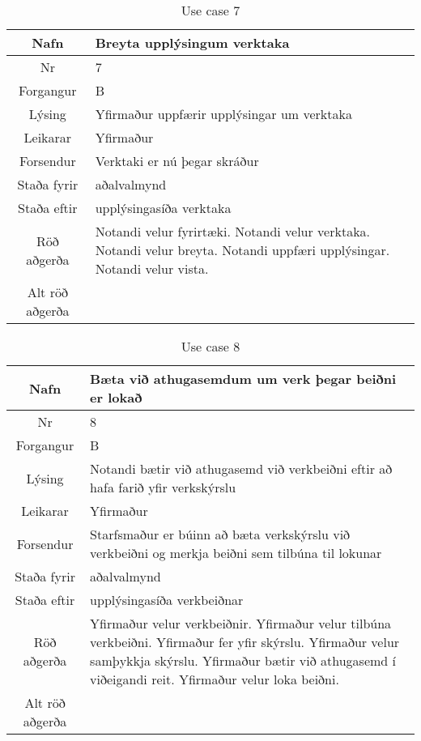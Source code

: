 \begin{table}[h!]\centering
\begin{tabular}{|c|p{10cm}|}
\hline
Nafn&Breyta upplýsingum verktaka \\
\hline
Nr&7\\
\hline
Forgangur&B\\
\hline
Lýsing&Yfirmaður uppfærir upplýsingar um verktaka\\
\hline
Leikarar&Yfirmaður\\
\hline
Forsendur&Verktaki er nú þegar skráður\\
\hline
Staða fyrir&aðalvalmynd\\
\hline
Staða eftir&upplýsingasíða verktaka\\
\hline
Röð aðgerða&Notandi velur fyrirtæki. Notandi velur verktaka. Notandi velur breyta. Notandi uppfæri upplýsingar. Notandi velur vista.\\
\hline
Alt röð aðgerða&\\
\hline
\end{tabular}
\caption{Use case 7}\label{tab:use_case_7}
\end{table}
\begin{table}[h!]\centering
\begin{tabular}{|c|p{10cm}|}
\hline
Nafn&Bæta við athugasemdum um verk þegar beiðni er lokað\\
\hline
Nr&8\\
\hline
Forgangur&B\\
\hline
Lýsing&Notandi bætir við athugasemd við verkbeiðni eftir að hafa farið yfir verkskýrslu\\
\hline
Leikarar&Yfirmaður\\
\hline
Forsendur&Starfsmaður er búinn að bæta verkskýrslu við verkbeiðni og merkja beiðni sem tilbúna til lokunar\\
\hline
Staða fyrir&aðalvalmynd\\
\hline
Staða eftir&upplýsingasíða verkbeiðnar\\
\hline
Röð aðgerða&Yfirmaður velur verkbeiðnir. Yfirmaður velur tilbúna verkbeiðni. Yfirmaður fer yfir skýrslu. Yfirmaður velur samþykkja skýrslu. Yfirmaður bætir við athugasemd í viðeigandi reit. Yfirmaður velur loka beiðni.\\
\hline
Alt röð aðgerða&\\
\hline
\end{tabular}
\caption{Use case 8}\label{tab:use_case_8}
\end{table}
